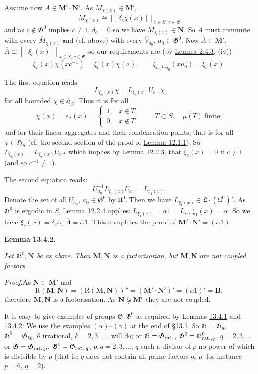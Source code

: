 \documentclass[12pt,b5paper,twoside]{article}
\newcommand{\Hspace}{\mathfrak H}
\newcommand{\M}{\mathbf M}
\newcommand{\N}{\mathbf N}
\newcommand{\B}{\mathbf B}
\newcommand{\R}{\mathrm R}
\newcommand{\Lemma}[1]{%
  \par\smallskip\noindent\phantomsection\label{lem:#1}\textbf{Lemma #1.}\enspace
}
\newcommand{\Proof}{\par\noindent\textit{Proof:}\enspace}
\newcommand{\secref}[1]{\hyperref[sec:#1]{\S#1}}
\newcommand{\lemref}[1]{\hyperref[lem:#1]{Lemma #1}}
\begin{document}
Assume now $\overline A\in\M'\mathbin{\cdot}\N'$. As
$\overline M_{\chi(x)}\in\M'$,
\[
 \overline M_{\chi(x)}\cong
 [[\delta_c\chi(x)]]_{x\in S,\,c\in\mathfrak G}
\]
and as $c\notin\mathfrak G^0$ implies $c\neq1$, $\delta_c=0$ so we have
$\overline M_{\chi(x)}\in\N$. So $\overline A$ must commute with every
$\overline M_{\chi(x)}$ and (cf. above) with every
$\overline V_{a_0}$, $a_0\in\mathfrak G^0$. Now
$\overline A\in\M'$, $\overline A\cong
[[\xi_c(x)]]_{x\in S,\,c\in\mathfrak G}$ so our requirements are (by
\lemref{2.4.3}, (iv))
\[
 \xi_c(x)\chi(xc^{-1})=\xi_c(x)\chi(x),
 \qquad
 \xi_{a_0^{-1}ca_0}(xa_0)=\xi_c(x).
\]

The first equation reads
\[
 L_{\xi_c(x)}\chi=L_{\xi_c(x)}U_{c^{-1}}\chi
\]
for all bounded $\chi\in\Hspace_S$. Thus it is for all
\[
 \chi(x)=e_T(x)=\begin{cases}
  1,&x\in T,\\
  0,&x\notin T,
 \end{cases}
 \qquad T\subset S,\quad \mu(T)\ \text{finite};
\]
and for their linear aggregates and their condensation points; that is for
all $\chi\in\Hspace_S$ (cf. the second section of the proof of
\lemref{12.1.1}). So
$L_{\xi_c(x)}=L_{\xi_c(x)}U_{c^{-1}}$ which implies by
\lemref{12.2.3}, that $\xi_c(x)=0$ if $c\neq1$ (and so $c^{-1}\neq1$).

The second equation reads:
\[
 U_{a_0}^{-1}L_{\xi_1(x)}U_{a_0}=L_{\xi_1(x)}.
\]
Denote the set of all $U_{a_0}$, $a_0\in\mathfrak G^0$ by $\mathfrak U^0$.
Then we have $L_{\xi_1(x)}\in\mathfrak L\mathbin{\cdot}(\mathfrak U^0)'$.
As $\mathfrak G^0$ is ergodic in $S$, \lemref{12.2.4} applies:
$L_{\xi_1(x)}=\alpha1=L_\alpha$, $\xi_1(x)=\alpha$. So we have
$\xi_c(x)=\delta_c\alpha$, $\overline A=\alpha1$. This completes the proof
of $\M'\mathbin{\cdot}\N'=(\alpha1)$.

\Lemma{13.4.2}
\emph{Let $\mathfrak G^0,\N$ be as above. Then $\M,\N$ is a factorisation,
but $\M,\N$ are not coupled factors.}

\Proof As $\N\subset\M'$ and
\[
 \R(\M,\N)=(\R(\M,\N))''=(\M'\mathbin{\cdot}\N')'
 =(\alpha1)'=\B,
\]
therefore $\M,\N$ is a factorisation. As $\N\varsubsetneqq\M'$ they are
not coupled.

It is easy to give examples of groups $\mathfrak G,\mathfrak G^0$ as
required by Lemmas \hyperref[lem:13.4.1]{13.4.1} and
\hyperref[lem:13.4.2]{13.4.2}: We use the examples
$(\alpha)$--$(\gamma)$
at the end of \secref{13.1}. So
$\mathfrak G=\mathfrak G_\theta$,
$\mathfrak G^0=\mathfrak G_{k\theta}$, $\theta$ irrational,
$k=2,3,\ldots$, will do; or
$\mathfrak G=\mathfrak G_{\rm rat.}$,
$\mathfrak G^0=\mathfrak G^0_{{\rm rat.},q}$, $q=2,3,\ldots$ or
$\mathfrak G=\mathfrak G_{{\rm rat.},p}$,
$\mathfrak G^0=\mathfrak G_{{\rm rat.},q}$, $p,q=2,3,\ldots$, $q$ such a
divisor of $p$ no power of which is divisible by $p$ (that is: $q$ does not
contain all prime factors of $p$, for instance $p=6$, $q=2$).
\end{document}
